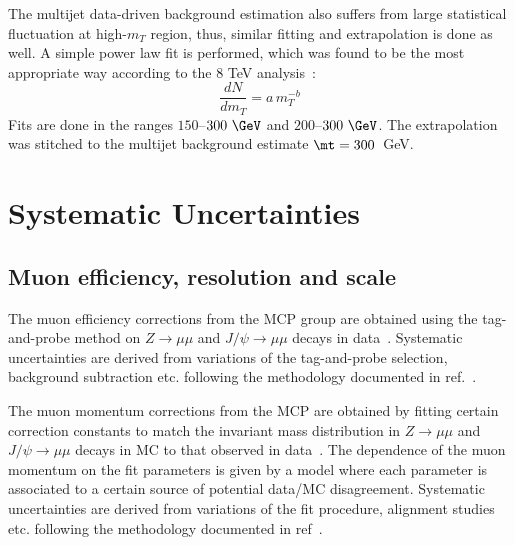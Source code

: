 The multijet data-driven background estimation also suffers from large statistical fluctuation at high-$m_T$ region, thus, similar fitting and extrapolation is done as well.
A simple power law fit is performed, which was found to be the most appropriate way according to the 8 TeV analysis~\cite{wprime_8TeV}:
\begin{equation}
\frac{dN}{d m_T} = a\, m_T^{-b}
\end{equation}
Fits are done in the ranges $150$--$300~\GeV$ and $200$--$300~\GeV$.
The extrapolation was stitched to the multijet background estimate $\mt=300$~GeV.



\section{Systematic Uncertainties}
\label{sec:wprimeSystematics}
\subsection{Muon efficiency, resolution and scale}
The muon efficiency corrections from the MCP group are obtained using the tag-and-probe method
on $Z\to\mu\mu$ and $J/\psi\to\mu\mu$ decays in data~\cite{MCP13TeV}. Systematic uncertainties
are derived from variations of the tag-and-probe selection, background subtraction etc. following
the methodology documented in ref.~\cite{MCPrun1}.

The muon momentum corrections from the MCP are obtained by fitting certain correction constants 
to match the invariant mass distribution in $Z\to\mu\mu$ and $J/\psi\to\mu\mu$ decays in MC
to that observed in data~\cite{MCP13TeV}. The dependence of the muon momentum on the fit parameters
is given by a model where each parameter is associated to a certain source of potential data/MC disagreement.
Systematic uncertainties are derived from variations of the fit procedure, alignment studies etc. 
following the methodology documented in ref~\cite{MCPrun1}.

